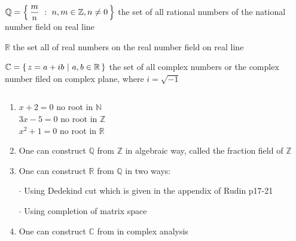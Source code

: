 $\mathbb{Q} = \left\{ \,\dfrac{m}{n}~:~n,m \in \mathbb{Z},n\neq 0 \,\right\}$ the set of all rational numbers of the national number field on real line

$\mathbb{R}$ the set all of real numbers on the real number field on real line

$\mathbb{C} = \left\{ \,z=a+ib~|~a,b\in\mathbb{R} \,\right\}$ the set of all complex numbers or the complex number filed on complex plane, where $i = \sqrt{-1}$

 \begin{rmk*}$ $
 	\begin{enumerate}
 		\item $x + 2 = 0$ no root in $\mathbb{N}$\\$3x - 5 = 0$ no root in $\mathbb{Z}$\\$x^2 + 1 = 0$ no root in $\mathbb{R}$
 		\item One can construct $\mathbb{Q}$ from $\mathbb{Z}$ in algebraic way, called the fraction field of $\mathbb{Z}$
 		\item One can construct $\mathbb{R}$ from $\mathbb{Q}$ in two ways:
 		
 		$\cdot$ Using Dedekind cut which is given in the appendix of Rudin p17-21
 		
 		$\cdot$ Using completion of matrix space
 		\item One can construct $\mathbb{C}$ from in complex analysis
 	\end{enumerate}
 \end{rmk*}
 
 \newpage

